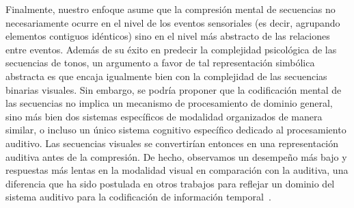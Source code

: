 
Finalmente, nuestro enfoque asume que la compresión mental de secuencias no necesariamente ocurre en el nivel de los eventos sensoriales (es decir, agrupando elementos contiguos idénticos) sino en el nivel más abstracto de las relaciones entre eventos. Además de su éxito en predecir la complejidad psicológica de las secuencias de tonos, un argumento a favor de tal representación simbólica abstracta es que encaja igualmente bien con la complejidad de las secuencias binarias visuales. Sin embargo, se podría proponer que la codificación mental de las secuencias no implica un mecanismo de procesamiento de dominio general, sino más bien dos sistemas específicos de modalidad organizados de manera similar, o incluso un único sistema cognitivo específico dedicado al procesamiento auditivo. Las secuencias visuales se convertirían entonces en una representación auditiva antes de la compresión. De hecho, observamos un desempeño más bajo y respuestas más lentas en la modalidad visual en comparación con la auditiva, una diferencia que ha sido postulada en otros trabajos para reflejar un dominio del sistema auditivo para la codificación de información temporal~\cite{f91,f118,f119}. 

